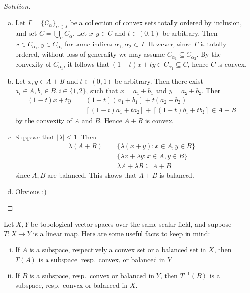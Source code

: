 \begin{proof}[Solution]
\begin{enumerate}[(a)]
		\item Let $\Gamma = \{C_\alpha\}_{\alpha\in J}$ be a collection of convex sets totally ordered by inclusion, and set $C = \bigcup_\alpha C_\alpha$. Let $x,y \in C$ and $t\in (0,1)$ be arbitrary. Then $x \in C_{\alpha_1}, y \in C_{\alpha_2}$ for some indices $\alpha_1, \alpha_2 \in J$. However, since $\Gamma$ is totally ordered, without loss of generality we may assume $C_{\alpha_1} \subseteq C_{\alpha_2}$. By the convexity of $C_{\alpha_2}$, it follows that $(1-t)x + ty \in C_{\alpha_2} \subseteq C$, hence $C$ is convex.
		
		\item Let $x,y \in A+B$ and $t \in (0,1)$ be arbitrary. Then there exist $a_i \in A, b_i \in B, i\in\{1,2\}$, such that $x=a_1+b_1$ and $y=a_2+b_2$. Then
		\begin{align*}
			(1-t)x+ty &= (1-t)(a_1+b_1) + t(a_2+b_2) \\
			&= [(1-t)a_1+ta_2] + [(1-t)b_1+tb_2] \in A+B
		\end{align*}
		by the convexity of $A$ and $B$. Hence $A+B$ is convex.
		
		\item Suppose that $|\lambda| \le 1$. Then
		\begin{align*}
			\lambda(A+B) &= \{ \lambda(x+y) : x\in A, y\in B \} \\
			&= \{ \lambda x + \lambda y : x\in A, y\in B\} \\
			&= \lambda A + \lambda B \subseteq A + B
		\end{align*}
		since $A, B$ are balanced. This shows that $A+B$ is balanced.
		
		\item Obvious :)
	\end{enumerate}
\end{proof}

\begin{remark}
	Let $X, Y$ be topological vector spaces over the same scalar field, and suppose $T : X \to Y$ is a linear map. Here are some useful facts to keep in mind:
	\begin{enumerate}[(i)]
		\item If $A$ is a subspace, respectively a convex set or a balanced set in $X$, then $T(A)$ is a subspace, resp.\ convex, or balanced in $Y$.
		\item If $B$ is a subspace, resp.\ convex or balanced in $Y$, then $T^{-1}(B)$ is a subspace, resp.\ convex or balanced in $X$.
	\end{enumerate}
\end{remark}

